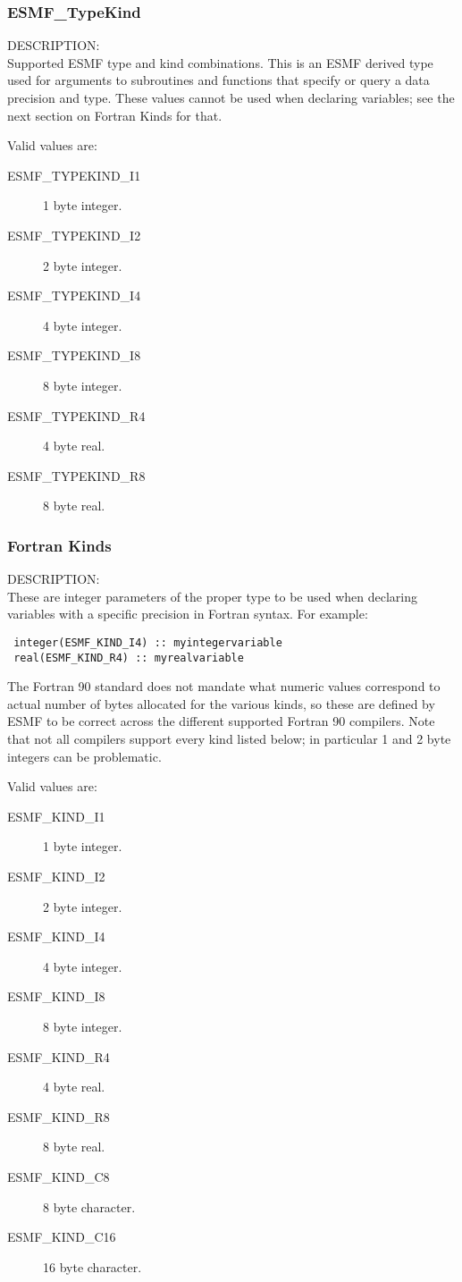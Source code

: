 \subsubsection{ESMF\_TypeKind}
\label{opt:typekind}

{\sf DESCRIPTION:\\}
Supported ESMF type and kind combinations.   
This is an ESMF derived type used for arguments to subroutines 
and functions that specify or query a data precision and type.
These values cannot be used when declaring variables; see the next 
section on Fortran Kinds for that.

Valid values are:
\begin{description}
\item [ESMF\_TYPEKIND\_I1]
      1 byte integer.
\item [ESMF\_TYPEKIND\_I2]
      2 byte integer.
\item [ESMF\_TYPEKIND\_I4]
      4 byte integer.
\item [ESMF\_TYPEKIND\_I8]
      8 byte integer.
\item [ESMF\_TYPEKIND\_R4]
      4 byte real.
\item [ESMF\_TYPEKIND\_R8]
      8 byte real.
\end{description}

\subsubsection{Fortran Kinds}

{\sf DESCRIPTION:\\}
These are integer parameters of the proper type to be
used when declaring variables with a specific precision 
in Fortran syntax.  For example:
\begin{verbatim}
 integer(ESMF_KIND_I4) :: myintegervariable
 real(ESMF_KIND_R4) :: myrealvariable
\end{verbatim}
The Fortran 90 standard does not mandate what numeric values
correspond to actual number of bytes allocated for the
various kinds, so these are defined by ESMF to be correct across
the different supported Fortran 90 compilers.   Note that not
all compilers support every kind listed below; in particular
1 and 2 byte integers can be problematic.

Valid values are:
\begin{description}
\item [ESMF\_KIND\_I1]
      1 byte integer.
\item [ESMF\_KIND\_I2]
      2 byte integer.
\item [ESMF\_KIND\_I4]
      4 byte integer.
\item [ESMF\_KIND\_I8]
      8 byte integer.
\item [ESMF\_KIND\_R4]
      4 byte real.
\item [ESMF\_KIND\_R8]
      8 byte real.
\item [ESMF\_KIND\_C8]
      8 byte character.
\item [ESMF\_KIND\_C16]
      16 byte character.
\end{description}

